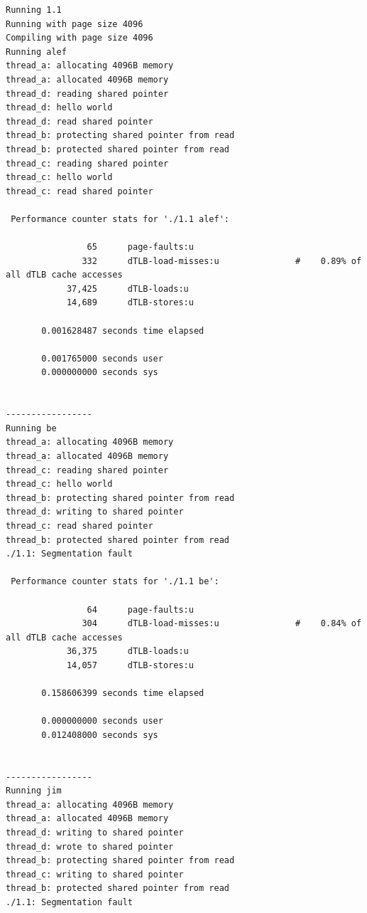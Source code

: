 \documentclass{article}
\begin{document}
\begin{latin}
\begin{lstlisting}
Running 1.1
Running with page size 4096
Compiling with page size 4096
Running alef
thread_a: allocating 4096B memory
thread_a: allocated 4096B memory
thread_d: reading shared pointer
thread_d: hello world
thread_d: read shared pointer
thread_b: protecting shared pointer from read
thread_b: protected shared pointer from read
thread_c: reading shared pointer
thread_c: hello world
thread_c: read shared pointer

 Performance counter stats for './1.1 alef':

                65      page-faults:u                                                         
               332      dTLB-load-misses:u               #    0.89% of all dTLB cache accesses
            37,425      dTLB-loads:u                                                          
            14,689      dTLB-stores:u                                                         

       0.001628487 seconds time elapsed

       0.001765000 seconds user
       0.000000000 seconds sys


-----------------
Running be
thread_a: allocating 4096B memory
thread_a: allocated 4096B memory
thread_c: reading shared pointer
thread_c: hello world
thread_b: protecting shared pointer from read
thread_d: writing to shared pointer
thread_c: read shared pointer
thread_b: protected shared pointer from read
./1.1: Segmentation fault

 Performance counter stats for './1.1 be':

                64      page-faults:u                                                         
               304      dTLB-load-misses:u               #    0.84% of all dTLB cache accesses
            36,375      dTLB-loads:u                                                          
            14,057      dTLB-stores:u                                                         

       0.158606399 seconds time elapsed

       0.000000000 seconds user
       0.012408000 seconds sys


-----------------
Running jim
thread_a: allocating 4096B memory
thread_a: allocated 4096B memory
thread_d: writing to shared pointer
thread_d: wrote to shared pointer
thread_b: protecting shared pointer from read
thread_c: writing to shared pointer
thread_b: protected shared pointer from read
./1.1: Segmentation fault


\end{lstlisting}
\end{latin}
\end{document}
